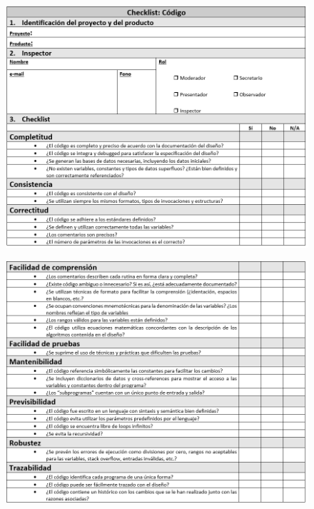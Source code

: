 \begin{figure}[H]
\centering
\includegraphics[width=1\textwidth]{figures/anexos/3-2-5a.PNG}
\end{figure}

\begin{figure}[H]
\centering
\includegraphics[width=1\textwidth]{figures/anexos/3-2-5b.PNG}
\end{figure}

